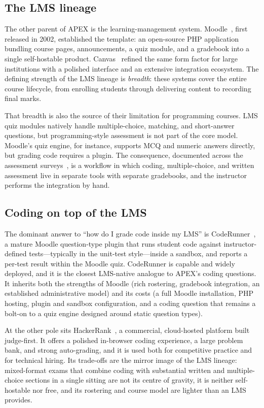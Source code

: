\subsection{The LMS lineage}

The other parent of APEX is the learning-management system. Moodle~\cite{moodle2002},
first released in 2002, established the template: an open-source PHP application bundling
course pages, announcements, a quiz module, and a gradebook into a single self-hostable
product. Canvas~\cite{canvas} refined the same form factor for large institutions with a
polished interface and an extensive integration ecosystem. The defining strength of the LMS
lineage is \emph{breadth}: these systems cover the entire course lifecycle, from enrolling
students through delivering content to recording final marks.

That breadth is also the source of their limitation for programming courses. LMS quiz
modules natively handle multiple-choice, matching, and short-answer questions, but
programming-style assessment is not part of the core model. Moodle's quiz engine, for
instance, supports MCQ and numeric answers directly, but grading code requires a plugin.
The consequence, documented across the assessment surveys~\cite{douce2005autoassess,%
ihantola2010autograding}, is a workflow in which coding, multiple-choice, and written
assessment live in separate tools with separate gradebooks, and the instructor performs the
integration by hand.

\subsection{Coding on top of the LMS}

The dominant answer to ``how do I grade code inside my LMS'' is
CodeRunner~\cite{coderunner}, a mature Moodle question-type plugin that runs student code
against instructor-defined tests---typically in the unit-test style---inside a sandbox, and
reports a per-test result within the Moodle quiz. CodeRunner is capable and widely deployed,
and it is the closest LMS-native analogue to APEX's coding questions. It inherits both the
strengths of Moodle (rich rostering, gradebook integration, an established administrative
model) and its costs (a full Moodle installation, PHP hosting, plugin and sandbox
configuration, and a coding question that remains a bolt-on to a quiz engine designed around
static question types).

At the other pole sits HackerRank~\cite{hackerrank}, a commercial, cloud-hosted platform
built judge-first. It offers a polished in-browser coding experience, a large problem bank,
and strong auto-grading, and it is used both for competitive practice and for technical
hiring. Its trade-offs are the mirror image of the LMS lineage: mixed-format exams that
combine coding with substantial written and multiple-choice sections in a single sitting are
not its centre of gravity, it is neither self-hostable nor free, and its rostering and
course model are lighter than an LMS provides.


